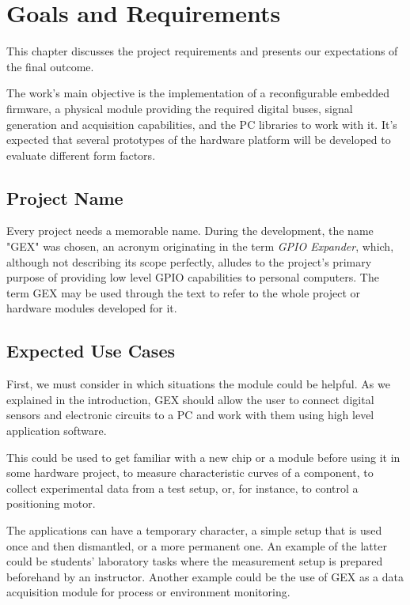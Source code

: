 \chapter{Goals and Requirements}

This chapter discusses the project requirements and presents our expectations of the final outcome.

The work's main objective is the implementation of a reconfigurable embedded firmware, a physical module providing the required digital buses, signal generation and acquisition capabilities, and the PC libraries to work with it. It's expected that several prototypes of the hardware platform will be developed to evaluate different form factors.

\section{Project Name}

Every project needs a memorable name. During the development, the name "GEX" was chosen, an acronym originating in the term \textit{GPIO Expander}, which, although not describing its scope perfectly, alludes to the project's primary purpose of providing low level GPIO capabilities to personal computers. The term GEX may be used through the text to refer to the whole project or hardware modules developed for it.

\section{Expected Use Cases}

First, we must consider in which situations the module could be helpful. As we explained in the introduction, GEX should allow the user to connect digital sensors and electronic circuits to a PC and work with them using high level application software.

This could be used to get familiar with a new chip or a module before using it in some hardware project, to measure characteristic curves of a component, to collect experimental data from a test setup, or, for instance, to control a positioning motor.

The applications can have a temporary character, a simple setup that is used once and then dismantled, or a more permanent one. An example of the latter could be students' laboratory tasks where the measurement setup is prepared beforehand by an instructor. Another example could be the use of GEX as a data acquisition module for process or environment monitoring.

